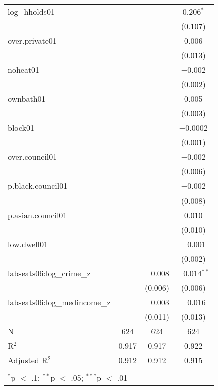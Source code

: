 \begin{table}[!htbp]
\begin{tabular}{@{\extracolsep{5pt}}lccc}
  log\_hholds01 &  &  & 0.206$^{*}$ \\ 
  &  &  & (0.107) \\ 
  over.private01 &  &  & 0.006 \\ 
  &  &  & (0.013) \\ 
  noheat01 &  &  & $-$0.002 \\ 
  &  &  & (0.002) \\ 
  ownbath01 &  &  & 0.005 \\ 
  &  &  & (0.003) \\ 
  block01 &  &  & $-$0.0002 \\ 
  &  &  & (0.001) \\ 
  over.council01 &  &  & $-$0.002 \\ 
  &  &  & (0.006) \\ 
  p.black.council01 &  &  & $-$0.002 \\ 
  &  &  & (0.008) \\ 
  p.asian.council01 &  &  & 0.010 \\ 
  &  &  & (0.010) \\ 
  low.dwell01 &  &  & $-$0.001 \\ 
  &  &  & (0.002) \\ 
  labseats06:log\_crime\_z &  & $-$0.008 & $-$0.014$^{**}$ \\ 
  &  & (0.006) & (0.006) \\ 
  labseats06:log\_medincome\_z &  & $-$0.003 & $-$0.016 \\ 
  &  & (0.011) & (0.013) \\ 
 N & 624 & 624 & 624 \\ 
R$^{2}$ & 0.917 & 0.917 & 0.922 \\ 
Adjusted R$^{2}$ & 0.912 & 0.912 & 0.915 \\ 
\hline \\[-1.8ex] 
\multicolumn{4}{l}{$^{*}$p $<$ .1; $^{**}$p $<$ .05; $^{***}$p $<$ .01} \\ 
\end{tabular} 
\end{table} 
